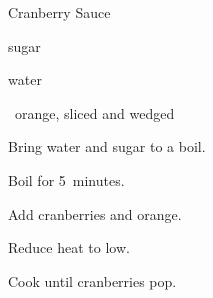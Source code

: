 \begin{recipe}{Cranberry Sauce}{}{}

\begin{ingredients}
\item {} sugar
\item {} water
\item {} 
\item \half~orange, sliced and wedged
\end{ingredients}

\begin{directions}
\item Bring water and sugar to a boil.
\item Boil for 5~minutes.
\item Add cranberries and orange.
\item Reduce heat to low.
\item Cook until cranberries pop.
\end{directions}

\end{recipe}
